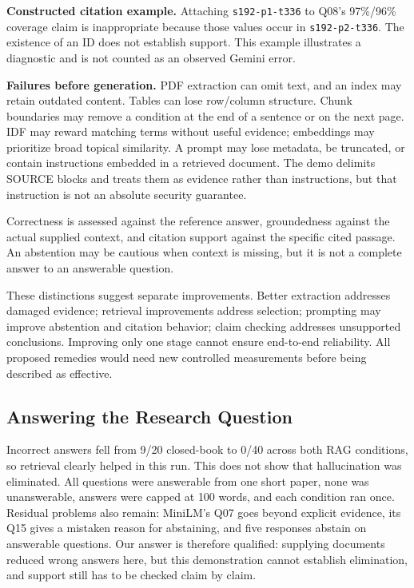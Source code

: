 \documentclass[12pt,a4paper]{article}
\begin{document}
\textbf{Constructed citation example.} Attaching \texttt{s192-p1-t336} to Q08's 97\%/96\% coverage claim is inappropriate because those values occur in \texttt{s192-p2-t336}. The existence of an ID does not establish support. This example illustrates a diagnostic and is not counted as an observed Gemini error.

\textbf{Failures before generation.} PDF extraction can omit text, and an index may retain outdated content. Tables can lose row/column structure. Chunk boundaries may remove a condition at the end of a sentence or on the next page. IDF may reward matching terms without useful evidence; embeddings may prioritize broad topical similarity. A prompt may lose metadata, be truncated, or contain instructions embedded in a retrieved document. The demo delimits SOURCE blocks and treats them as evidence rather than instructions, but that instruction is not an absolute security guarantee.

Correctness is assessed against the reference answer, groundedness against the actual supplied context, and citation support against the specific cited passage. An abstention may be cautious when context is missing, but it is not a complete answer to an answerable question.

These distinctions suggest separate improvements. Better extraction addresses damaged evidence; retrieval improvements address selection; prompting may improve abstention and citation behavior; claim checking addresses unsupported conclusions. Improving only one stage cannot ensure end-to-end reliability. All proposed remedies would need new controlled measurements before being described as effective.

\subsection*{Answering the Research Question}
Incorrect answers fell from 9/20 closed-book to 0/40 across both RAG conditions, so retrieval clearly helped in this run. This does not show that hallucination was eliminated. All questions were answerable from one short paper, none was unanswerable, answers were capped at 100 words, and each condition ran once. Residual problems also remain: MiniLM's Q07 goes beyond explicit evidence, its Q15 gives a mistaken reason for abstaining, and five responses abstain on answerable questions. Our answer is therefore qualified: supplying documents reduced wrong answers here, but this demonstration cannot establish elimination, and support still has to be checked claim by claim.
\end{document}
